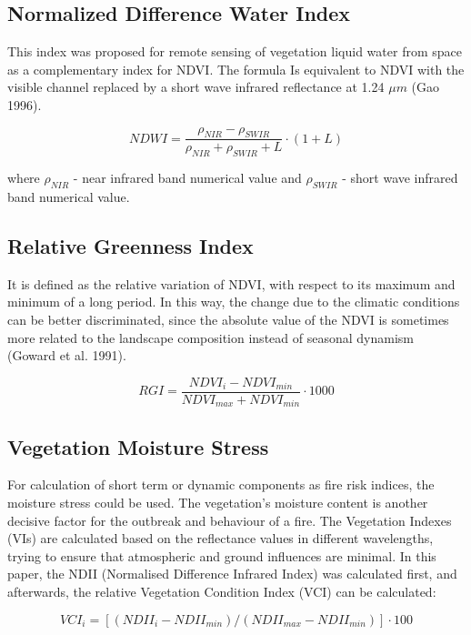 {{{\subsection{Normalized Difference Water Index}
	This index was proposed for remote sensing of vegetation liquid water from space as a complementary
	index for NDVI. The formula Is equivalent to NDVI with the visible channel replaced by a short wave
	infrared reflectance at 1.24 $\mu m$ (Gao 1996).
	
	\begin{equation}
	NDWI = \dfrac{\rho_{NIR} - \rho_{SWIR}}{\rho_{NIR} + \rho_{SWIR} + L} \cdot (1 + L)
	\end{equation}
	
	where $\rho_{NIR}$ - near infrared band numerical value and $\rho_{SWIR}$ - short wave infrared band numerical value.
	
\subsection{Relative Greenness Index}
	It is defined as the relative variation of NDVI, with respect to its maximum and minimum of a long
	period. In this way, the change due to the climatic conditions can be better discriminated, since the absolute value of the NDVI is sometimes more related to the landscape composition instead of seasonal
	dynamism (Goward et al. 1991).
	
	\begin{equation}
	RGI = \dfrac{NDVI_{i} - NDVI_{min}}{NDVI_{max} + NDVI_{min}} \cdot 1000
	\end{equation}

\subsection{Vegetation Moisture Stress}
	For calculation of short term or dynamic components as fire risk indices, the moisture stress could be used.
	The vegetation’s moisture content is another decisive factor for the outbreak and behaviour of a fire.
	The Vegetation Indexes (VIs) are calculated based on the reflectance values in different
	wavelengths, trying to ensure that atmospheric and ground influences are minimal. In this
	paper, the NDII (Normalised Difference Infrared Index) was calculated first, and afterwards, the relative Vegetation Condition Index (VCI) can be calculated:
	
	\begin{equation}
	VCI_{i}=[(NDII_{i} - NDII_{min})/(NDII_{max} - NDII_{min})] \cdot 100
	\end{equation}
	
}}}

